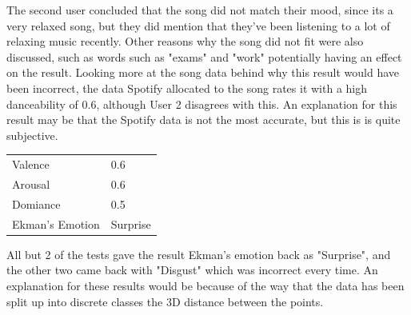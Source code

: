 The second user concluded that the song did not match their mood, since its a very relaxed song, but they did mention that they've been listening to a lot of relaxing music recently. Other reasons why the song did not fit were also discussed, such as words such as "exams" and "work" potentially having an effect on the result. Looking more at the song data behind why this result would have been incorrect, the data Spotify allocated to the song rates it with a high danceability of 0.6, although User 2 disagrees with this. An explanation for this result may be that the Spotify data is not the most accurate, but this is is quite subjective.

\begin{table}[h]
\centering
\begin{tabular}{|l|l|}
\hline
 Valence &  0.6\\
 Arousal &  0.6\\
 Domiance &  0.5\\
 Ekman's Emotion &  Surprise\\ \hline
\end{tabular}
\end{table}

All but 2 of the tests gave the result Ekman's emotion back as "Surprise", and the other two came back with "Disgust" which was incorrect every time. An explanation for these results would be because of the way that the data has been split up into discrete classes the 3D distance between the points.